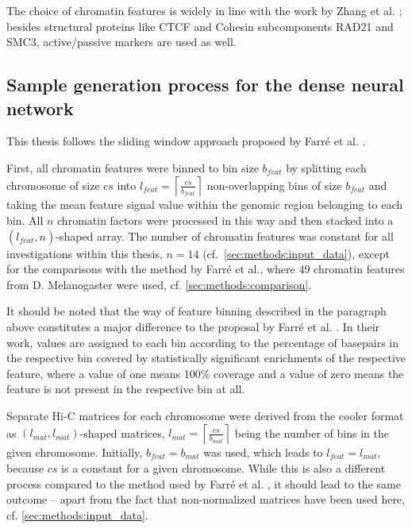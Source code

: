 The choice of chromatin features is widely in line with the work by Zhang et al. \cite{Zhang2019}; 
besides structural proteins like CTCF and Cohesin subcomponents RAD21 and SMC3, active/passive markers are used as well.

\subsection{Sample generation process for the dense neural network} \label{sec:methods:sample_gen}
This thesis follows the sliding window approach proposed by Farr\'e et al. \cite{Farre2018a}.

First, all chromatin features were binned to bin size $b_\mathit{feat}$ by splitting each chromosome of size $cs$ into 
$l_\mathit{feat}=\left \lceil{\frac{cs}{b_\mathit{feat}}}\right \rceil$ non-overlapping bins of size $b_\mathit{feat}$
and taking the mean feature signal value within the genomic region belonging to each bin.
All $n$ chromatin factors were processed in this way and then stacked into a $(l_\mathit{feat},n)$-shaped array.
The number of chromatin features was constant for all investigations within this thesis, $n=14$ (cf.~\cref{sec:methods:input_data}),
except for the comparisons with the method by Farr\'e et al., where 49 chromatin features from D. Melanogaster were used, cf. \cref{sec:methods:comparison}.

It should be noted that the way of feature binning described in the paragraph above constitutes a major difference to the proposal by Farr\'e et al. \cite[p.~9]{Farre2018a}.
In their work, values are assigned to each bin according to the percentage of basepairs in the respective bin covered by statistically significant enrichments of the respective feature,
where a value of one means 100\% coverage and a value of zero means the feature is not present in the respective bin at all.

Separate Hi-C matrices for each chromosome were derived from the cooler format as $(l_\mathit{mat}, l_\mathit{mat})$-shaped matrices, 
$l_\mathit{mat}=\left \lceil{\frac{cs}{b_\mathit{mat}}}\right \rceil$ being the number of bins in the given chromosome. 
Initially, $b_\mathit{feat} = b_\mathit{mat}$ was used, which leads to $l_\mathit{feat} = l_\mathit{mat}$, because $cs$ is a constant for a given chromosome.
While this is also a different process compared to the method used by Farr\'e et al. \cite[p.~8f]{Farre2018a}, it should lead to the same outcome --
apart from the fact that non-normalized matrices have been used here, cf. \cref{sec:methods:input_data}.

